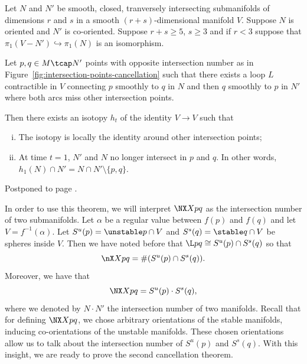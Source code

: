 \begin{theorem}[Whitney]
    Let $N$ and  $N'$ be smooth, closed, tranversely intersecting submanifolds of dimensions  $r$ and $s$ in a smooth  $(r+s)$-dimensional manifold $V$.
    Suppose  $N$ is oriented and  $N'$ is co-oriented.
    Suppose $r+s \ge 5$, $s\ge 3$ and if $r<3$ suppose that $\pi_1(V - N') \hookrightarrow \pi_1(N)$ is an isomorphism.

    Let $p, q \in  M \tcap N'$ points with opposite intersection number as in Figure~\ref{fig:intersection-points-cancellation} such that there exists a loop $L$ contractible in  $V$ connecting  $p$ smoothly to $q$ in  $N$  and then $q$ smoothly to  $p$ in $N'$ where both arcs miss other intersection points.

    Then there exists an isotopy $h_t$ of the identity $V \to V$ such that
    \begin{enumerate}[(i)]
        \item The isotopy is locally the identity around other intersection points;
        \item At time  $t = 1$,  $N'$ and  $N$ no longer intersect in $p$ and $q$.  In other words, $h_1(N) \cap N' = N \cap  N' \setminus \{ p, q\} $.
    \end{enumerate}
\end{theorem}
\begin{myproof}
    Postponed to page \pageref{proof:whitney}.
\end{myproof}
\begin{marginfigure}[-6.5cm]
    \centering
    \caption{
    Under certain conditions, we can `cancel' intersection points of opposite intersection number by deforming the manifold $M$ by an isotopy.}
    \label{fig:intersection-points-cancellation}
\end{marginfigure}

\begin{marginfigure}
    \centering
    \caption{Setup of the second cancellation theorem in dimension two and three. Note the figure is somewhat misleading because of dimensionality reasons.}
    \label{fig:second-cancellation-theorem-setup}
\end{marginfigure}
In order to use this theorem, we will interpret $\NX X pq$ as the intersection number of two submanifolds.
Let $\alpha$ be a regular value between  $f(p)$ and  $f(q)$ and let $V = f^{-1}(\alpha)$.
Let $S^{u}(p) = \unstable p \cap V$ and 
$S^{s}(q) = \stable q \cap V$ be spheres inside $V$.
Then we have noted before that $\L pq \cong S^{u}(p) \cap S^{s}(q)$ so that \[
    \nX Xpq = \# (S^{u}(p) \cap S^{s}(q)).
\]
Moreover, we have that
\[
    \NX X pq = S^{u}(p) \cdot S^{s}(q)
,\] 
where we denoted by $N \cdot N'$ the intersection number of two manifolds.
Recall that for defining $\NX X pq$,
we chose arbitrary orientations of the stable manifolds, inducing co-orientations of the unstable manifolds.
These chosen orientations allow us to talk about the intersection number of $S^{u}(p)$ and $S^{s}(q)$.
With this insight, we are ready to prove the second cancellation theorem.

